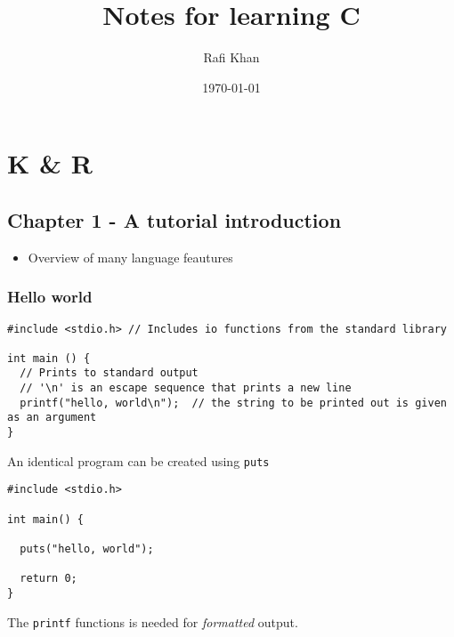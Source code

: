 \documentclass[11pt]{article}
\author{Rafi Khan}
\date{\today}
\title{Notes for learning C}
\begin{document}
\maketitle
\tableofcontents

\section{K \& R}
\label{sec-1}
\subsection{Chapter 1 - A tutorial introduction}
\label{sec-1-1}
\begin{itemize}
\item Overview of many language feautures
\end{itemize}

\subsubsection{Hello world}
\label{sec-1-1-1}
\begin{verbatim}
#include <stdio.h> // Includes io functions from the standard library

int main () {
  // Prints to standard output
  // '\n' is an escape sequence that prints a new line
  printf("hello, world\n");  // the string to be printed out is given as an argument
}
\end{verbatim}

An identical program can be created using \texttt{puts}
\begin{verbatim}
#include <stdio.h>

int main() {

  puts("hello, world");

  return 0;
}
\end{verbatim}

The \texttt{printf} functions is needed for \emph{formatted} output.
\end{document}
